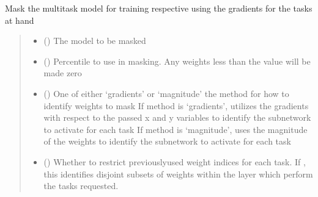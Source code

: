 \documentclass[letterpaper,10pt,english]{sphinxmanual}
\begin{document}
\begin{fulllineitems}
\label{\detokenize{beyondml.tflow.utils:beyondml.tflow.utils.utils.mask_model}}
\pysigstartsignatures
{}
\pysigstopsignatures
\sphinxAtStartPar
Mask the multitask model for training respective using the gradients for the tasks at hand
\begin{quote}\begin{description}
\begin{itemize}
\item {} 
\sphinxAtStartPar
{} () \textendash{} The model to be masked

\item {} 
\sphinxAtStartPar
{} () \textendash{} Percentile to use in masking. Any weights less than the  value will be made zero

\item {} 
\sphinxAtStartPar
{} (\sphinxstyleliteralemphasis{\sphinxupquote{ (}}\sphinxstyleliteralemphasis{\sphinxupquote{)}}) \textendash{} One of either ‘gradients’ or ‘magnitude’ \sphinxhyphen{} the method for how to identify weights to mask
If method is ‘gradients’, utilizes the gradients with respect to the passed x and y variables
to identify the subnetwork to activate for each task
If method is ‘magnitude’, uses the magnitude of the weights to identify the subnetwork to activate for each task

\item {} 
\sphinxAtStartPar
{} (\sphinxstyleliteralemphasis{\sphinxupquote{ (}}\sphinxstyleliteralemphasis{\sphinxupquote{)}}) \textendash{} Whether to restrict previously\sphinxhyphen{}used weight indices for each task. If , this identifies disjoint subsets of
weights within the layer which perform the tasks requested.


\end{itemize}
\end{description}
\end{quote}
\end{fulllineitems}
\end{document}
